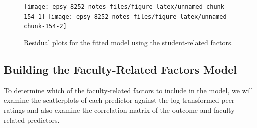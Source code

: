 \documentclass[]{book}
\newenvironment{Shaded}{\begin{snugshade}}{\end{snugshade}}
\newcommand{\CommentTok}[1]{\textcolor[rgb]{0.56,0.35,0.01}{\textit{#1}}}
\newcommand{\DataTypeTok}[1]{\textcolor[rgb]{0.13,0.29,0.53}{#1}}
\newcommand{\DecValTok}[1]{\textcolor[rgb]{0.00,0.00,0.81}{#1}}
\newcommand{\FloatTok}[1]{\textcolor[rgb]{0.00,0.00,0.81}{#1}}
\newcommand{\KeywordTok}[1]{\textcolor[rgb]{0.13,0.29,0.53}{\textbf{#1}}}
\newcommand{\NormalTok}[1]{#1}
\newcommand{\OperatorTok}[1]{\textcolor[rgb]{0.81,0.36,0.00}{\textbf{#1}}}
\newcommand{\StringTok}[1]{\textcolor[rgb]{0.31,0.60,0.02}{#1}}
\begin{document}
\begin{Shaded}
\end{Shaded}

\begin{figure}

{\centering \texttt{[image: epsy-8252-notes\_files/figure-latex/unnamed-chunk-154-1]} \texttt{[image: epsy-8252-notes\_files/figure-latex/unnamed-chunk-154-2]} 

}

\caption{Residual plots for the fitted model using the student-related factors.}\label{fig:unnamed-chunk-154}
\end{figure}

\hypertarget{building-the-faculty-related-factors-model}{%
\subsection{Building the Faculty-Related Factors Model}\label{building-the-faculty-related-factors-model}}

To determine which of the faculty-related factors to include in the model, we will examine the scatterplots of each predictor against the log-transformed peer ratings and also examine the correlation matrix of the outcome and faculty-related predictors.
\end{document}
